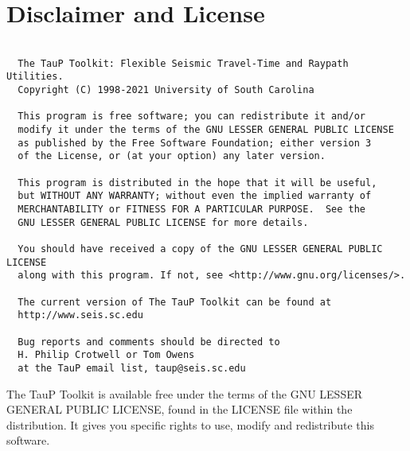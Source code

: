 
\section*{Disclaimer and License}
\begin{verbatim}

  The TauP Toolkit: Flexible Seismic Travel-Time and Raypath Utilities.
  Copyright (C) 1998-2021 University of South Carolina

  This program is free software; you can redistribute it and/or
  modify it under the terms of the GNU LESSER GENERAL PUBLIC LICENSE
  as published by the Free Software Foundation; either version 3
  of the License, or (at your option) any later version.

  This program is distributed in the hope that it will be useful,
  but WITHOUT ANY WARRANTY; without even the implied warranty of
  MERCHANTABILITY or FITNESS FOR A PARTICULAR PURPOSE.  See the
  GNU LESSER GENERAL PUBLIC LICENSE for more details.

  You should have received a copy of the GNU LESSER GENERAL PUBLIC LICENSE
  along with this program. If not, see <http://www.gnu.org/licenses/>.

  The current version of The TauP Toolkit can be found at
  http://www.seis.sc.edu

  Bug reports and comments should be directed to
  H. Philip Crotwell or Tom Owens
  at the TauP email list, taup@seis.sc.edu

\end{verbatim}

The TauP Toolkit is available free under the terms of the
GNU LESSER GENERAL PUBLIC LICENSE, found in the
LICENSE
file within the distribution. It gives you
specific rights to use, modify and redistribute this software.
